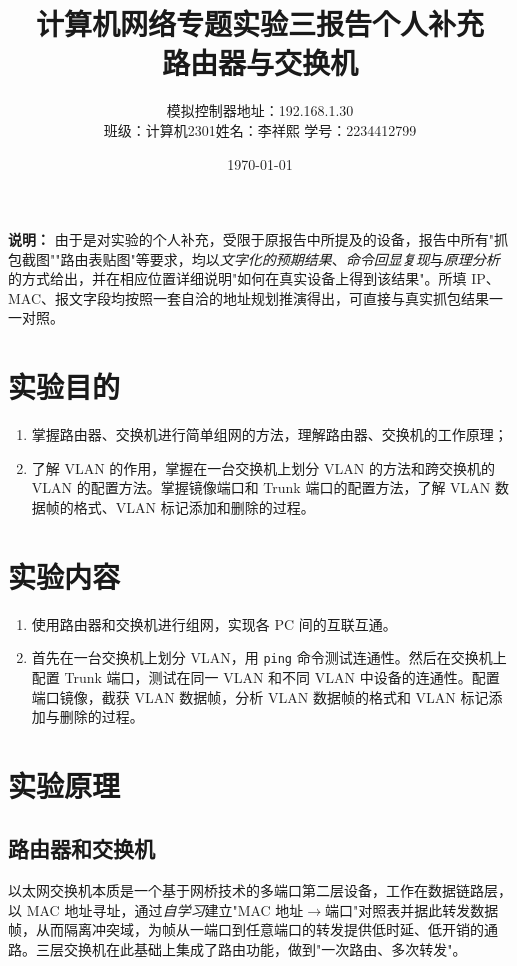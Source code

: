 \documentclass[12pt,a4paper]{article}
\title{计算机网络专题实验三报告个人补充\\\large 路由器与交换机}
\author{模拟控制器地址：192.168.1.30\\
班级：计算机2301\quad 姓名：李祥熙 \quad 学号：2234412799}
\date{\today}
\begin{document}
\maketitle

\vspace{1em}

\noindent\textbf{说明：} 由于是对实验的个人补充，受限于原报告中所提及的设备，报告中所有"抓包截图""路由表贴图"等要求，均以\emph{文字化的预期结果}、\emph{命令回显复现}与\emph{原理分析}的方式给出，并在相应位置详细说明"如何在真实设备上得到该结果"。所填 IP、MAC、报文字段均按照一套自洽的地址规划推演得出，可直接与真实抓包结果一一对照。

\section{实验目的}

\begin{enumerate}
  \item 掌握路由器、交换机进行简单组网的方法，理解路由器、交换机的工作原理；
  \item 了解 VLAN 的作用，掌握在一台交换机上划分 VLAN 的方法和跨交换机的 VLAN 的配置方法。掌握镜像端口和 Trunk 端口的配置方法，了解 VLAN 数据帧的格式、VLAN 标记添加和删除的过程。
\end{enumerate}

\section{实验内容}

\begin{enumerate}
  \item 使用路由器和交换机进行组网，实现各 PC 间的互联互通。
  \item 首先在一台交换机上划分 VLAN，用 \texttt{ping} 命令测试连通性。然后在交换机上配置 Trunk 端口，测试在同一 VLAN 和不同 VLAN 中设备的连通性。配置端口镜像，截获 VLAN 数据帧，分析 VLAN 数据帧的格式和 VLAN 标记添加与删除的过程。
\end{enumerate}

\section{实验原理}

\subsection{路由器和交换机}
以太网交换机本质是一个基于网桥技术的多端口第二层设备，工作在数据链路层，以 MAC 地址寻址，通过\emph{自学习}建立"MAC 地址$\to$端口"对照表并据此转发数据帧，从而隔离冲突域，为帧从一端口到任意端口的转发提供低时延、低开销的通路。三层交换机在此基础上集成了路由功能，做到"一次路由、多次转发"。
\end{document}

